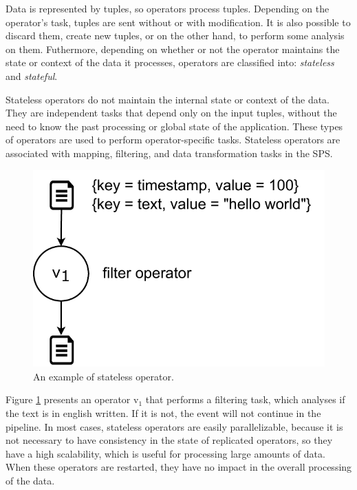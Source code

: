 Data is represented by tuples, so operators process tuples. Depending on the operator's task, tuples are sent without or with modification. It is also possible to discard them, create new tuples, or on the other hand, to perform some analysis on them. Futhermore, depending on whether or not the operator maintains the state or context of the data it processes, operators are classified into: \textit{stateless} and \textit{stateful}.

Stateless operators do not maintain the internal state or context of the data. They are independent tasks that depend only on the input tuples, without the need to know the past processing or global state of the application. These types of operators are used to perform operator-specific tasks. Stateless operators are associated with mapping, filtering, and data transformation tasks in the SPS.

\begin{figure}[ht!]
  \centering
    \includegraphics[scale=0.6]{figures/concepts/SPS-Stateless-Operator.pdf}
  \caption{An example of stateless operator.}
  \label{fig:sps-stateless-operator}
\end{figure}

Figure \ref{fig:sps-stateless-operator} presents an operator $\text{v}_1$ that performs a filtering task, which analyses if the text is in english written. If it is not, the event will not continue in the pipeline. In most cases, stateless operators are easily parallelizable, because it is not necessary to have consistency in the state of replicated operators, so they have a high scalability, which is useful for processing large amounts of data. When these operators are restarted, they have no impact in the overall processing of the data.

